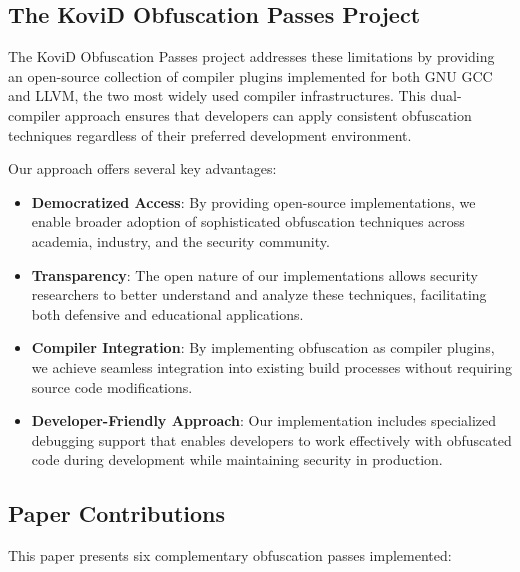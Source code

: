 \documentclass[conference]{IEEEtran}
\begin{document}
\subsection{The KoviD Obfuscation Passes Project}
The KoviD Obfuscation Passes project \cite{kovidobfspasses} addresses these limitations by providing an open-source collection of compiler plugins implemented for both GNU GCC and LLVM, the two most widely used compiler infrastructures. This dual-compiler approach ensures that developers can apply consistent obfuscation techniques regardless of their preferred development environment.

Our approach offers several key advantages:

\begin{itemize}
    \item \textbf{Democratized Access}: By providing open-source implementations, we enable broader adoption of sophisticated obfuscation techniques across academia, industry, and the security community.
    
    \item \textbf{Transparency}: The open nature of our implementations allows security researchers to better understand and analyze these techniques, facilitating both defensive and educational applications.
    
    \item \textbf{Compiler Integration}: By implementing obfuscation as compiler plugins, we achieve seamless integration into existing build processes without requiring source code modifications.
    
    \item \textbf{Developer-Friendly Approach}: Our implementation includes specialized debugging support that enables developers to work effectively with obfuscated code during development while maintaining security in production.
\end{itemize}

\subsection{Paper Contributions}
This paper presents six complementary obfuscation passes implemented:
\end{document}
